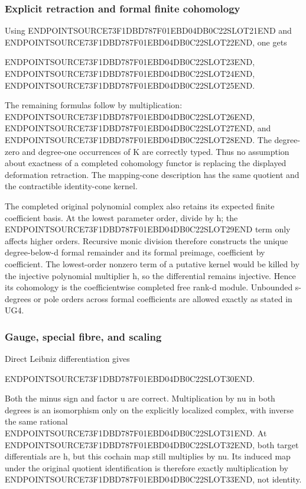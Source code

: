 \subsubsection{Explicit retraction and formal finite cohomology}\label{endpoint-f1_unit_gauge_review--explicit-retraction-and-formal-finite-cohomology}

Using ENDPOINTSOURCE73F1DBD787F01EBD04DB0C22SLOT21END and ENDPOINTSOURCE73F1DBD787F01EBD04DB0C22SLOT22END, one gets

ENDPOINTSOURCE73F1DBD787F01EBD04DB0C22SLOT23END, ENDPOINTSOURCE73F1DBD787F01EBD04DB0C22SLOT24END, ENDPOINTSOURCE73F1DBD787F01EBD04DB0C22SLOT25END.

The remaining formulas follow by multiplication: ENDPOINTSOURCE73F1DBD787F01EBD04DB0C22SLOT26END, ENDPOINTSOURCE73F1DBD787F01EBD04DB0C22SLOT27END, and ENDPOINTSOURCE73F1DBD787F01EBD04DB0C22SLOT28END. The degree-zero and degree-one occurrences of K are correctly typed. Thus no assumption about exactness of a completed cohomology functor is replacing the displayed deformation retraction. The mapping-cone description has the same quotient and the contractible identity-cone kernel.

The completed original polynomial complex also retains its expected finite coefficient basis. At the lowest parameter order, divide by h; the ENDPOINTSOURCE73F1DBD787F01EBD04DB0C22SLOT29END term only affects higher orders. Recursive monic division therefore constructs the unique degree-below-d formal remainder and its formal preimage, coefficient by coefficient. The lowest-order nonzero term of a putative kernel would be killed by the injective polynomial multiplier h, so the differential remains injective. Hence its cohomology is the coefficientwise completed free rank-d module. Unbounded s-degrees or pole orders across formal coefficients are allowed exactly as stated in UG4.

\subsubsection{Gauge, special fibre, and scaling}\label{endpoint-f1_unit_gauge_review--gauge-special-fibre-and-scaling}

Direct Leibniz differentiation gives

ENDPOINTSOURCE73F1DBD787F01EBD04DB0C22SLOT30END.

Both the minus sign and factor u are correct. Multiplication by nu in both degrees is an isomorphism only on the explicitly localized complex, with inverse the same rational ENDPOINTSOURCE73F1DBD787F01EBD04DB0C22SLOT31END. At ENDPOINTSOURCE73F1DBD787F01EBD04DB0C22SLOT32END, both target differentials are h, but this cochain map still multiplies by nu. Its induced map under the original quotient identification is therefore exactly multiplication by ENDPOINTSOURCE73F1DBD787F01EBD04DB0C22SLOT33END, not identity.

